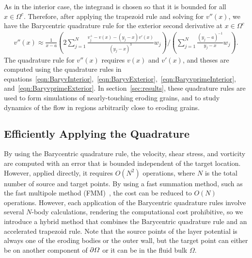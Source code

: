 \documentclass{jfm}
\begin{document}
As in the interior case, the integrand is chosen so that it is bounded
for all $x \in \Omega^c$.  Therefore, after applying the trapezoid rule
and solving for $v''(x)$, we have the Barycentric quadrature rule for
the exterior second derivative at $x \in \Omega^c$
\begin{align}
  v''(x) \approx \frac{1}{x-a}\left(2\sum\limits_{j=1}^N
    \frac{v^{+}_{j} - v(x) - (y_j-x)v'(x)}{(y_j-x)^3}w_j\right)
    \Bigg/
    \left(\sum_{j=1}^N \frac{(y_j-a)^{-1}}{y_j-x}w_j\right).
\end{align}
The quadrature rule for $v''(x)$ requires $v(x)$ and $v'(x)$, and theses
are computed using the quadrature rules in
equations~\eqref{eqn:BaryvInterior},~\eqref{eqn:BaryvExterior},~\eqref{eqn:BaryvprimeInterior},
and~\eqref{eqn:BaryvprimeExterior}. In section~\ref{sec:results}, these
quadrature rules are used to form simulations of nearly-touching eroding
grains, and to study dynamics of the flow in regions arbitrarily close
to eroding grains.

\subsection{Efficiently Applying the Quadrature}
\label{sec:fmm}
By using the Barycentric quadrature rule, the velocity, shear stress,
and vorticity are computed with an error that is bounded independent of
the target location. However, applied directly, it requires
$O(N^2)$ operations, where $N$ is the total number of source
and target points.  By using a fast summation method, such as the fast
multipole method (FMM)~\citep{gre-rok1987}, the cost can be reduced to
$O(N)$ operations.  However, each application of the Barycentric
quadrature rules involve several $N$-body calculations, rendering the
computational cost prohibitive, so we introduce a hybrid method that
combines the Barycentric quadrature rule and an accelerated trapezoid
rule.  Note that the source points of the layer potential is always one
of the eroding bodies or the outer wall, but the target point can either
be on another component of ${\partial}\varOmega$ or it can be in the fluid bulk
$\Omega$.
\end{document}
